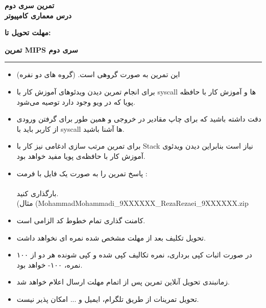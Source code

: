 
\def \Subject {تمرین سری دوم}
\def \Course {درس معماری کامپیوتر}
\def \Report {تمرین MIPS سری دوم}

\begin{center}
\vspace{.4cm}
{\bf {\huge \Subject}}\\
{\bf \Large \Course}
\vspace{.2cm}
\end{center}
{\bf مهلت تحویل تا: \date{1402/02/23}}    
\hspace{\fill} 
{\bf \Large \Report} \\
\hrule
\vspace{0.8cm}

\begin{itemize}
    \item این تمرین به صورت گروهی است. (گروه های دو نفره) 
    \item برای انجام تمرین دیدن ویدئوهای آموزش کار با syscall ها و آموزش کار با حافظه پویا که در ویو وجود دارد توصیه می‌شود.
    \item دقت داشته باشید که برای چاپ مقادیر در خروجی و همین طور برای گرفتن ورودی از کاربر باید با syscall ها آشنا باشید.
    \item برای تمرین مرتب سازی ادغامی نیز کار با Stack نیاز است بنابراین دیدن ویدئوی آموزش کار با حافظه‌ی پویا مفید خواهد بود.
    \item  پاسخ تمرین را به صورت یک فایل با فرمت : \\\\ بارگذاری کنید.
    \\(مثال (MohammadMohammadi\_9XXXXXX\_RezaRezaei\_9XXXXXX.zip
    \item کامنت گذاری تمام خطوط کد الزامی است.
    \item تحویل تکلیف بعد از مهلت مشخص شده نمره ای نخواهد داشت.
    \item در صورت اثبات کپی برداری، نمره تکالیف کپی شده و کپی شونده هر دو از ۱۰۰ نمره، ۱۰۰- خواهد بود.
    \item زمانبندی تحویل آنلاین تمرین پس از اتمام مهلت ارسال اعلام خواهد شد.
    \item تحویل تمرینات از طریق تلگرام، ایمیل و ... امکان پذیر نیست.
\end{itemize}

